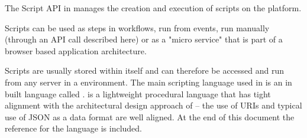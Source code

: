 The Script API in \Rapture manages the creation and execution of scripts on the platform.

Scripts can be used as steps in workflows, run from events, run manually (through an API call
described here) or as a "micro service" that is part of a browser based application architecture.

Scripts are usually stored within \Rapture itself and can therefore be accessed and run from any
server in a \Rapture environment. The main scripting language used in \Rapture is an in built language
called \Reflex. \Reflex is a lightweight procedural language that has tight alignment with the
architectural design approach of \Rapture -- the use of URIs and typical use of JSON as a data format are
well aligned. At the end of this document the reference for the \Reflex language is included.
